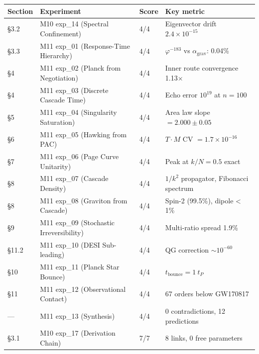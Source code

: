 \documentclass[11pt,a4paper]{article}
\begin{document}
\begin{longtable}[]{@{}llll@{}}
\toprule
Section & Experiment & Score & Key metric \\
\midrule\endhead
§3.2 & M10 exp\_14 (Spectral Confinement) & 4/4 & Eigenvector drift $2.4 \times 10^{-15}$ \\
§3.3 & M11 exp\_01 (Response-Time Hierarchy) & 4/4 & $\varphi^{-183}$ vs $\alpha_{\text{grav}}$: 0.04\% \\
§4 & M11 exp\_02 (Planck from Negotiation) & 4/4 & Inner route convergence 1.13$\times$ \\
§4 & M11 exp\_03 (Discrete Cascade Time) & 4/4 & Echo error $10^{19}$ at $n = 100$ \\
§5 & M11 exp\_04 (Singularity Saturation) & 4/4 & Area law slope $= 2.000 \pm 0.05$ \\
§6 & M11 exp\_05 (Hawking from PAC) & 4/4 & $T \cdot M$ CV $= 1.7 \times 10^{-16}$ \\
§7 & M11 exp\_06 (Page Curve Unitarity) & 4/4 & Peak at $k/N = 0.5$ exact \\
§8 & M11 exp\_07 (Cascade Density) & 4/4 & $1/k^2$ propagator, Fibonacci spectrum \\
§8 & M11 exp\_08 (Graviton from Cascade) & 4/4 & Spin-2 (99.5\%), dipole < 1\% \\
§9 & M11 exp\_09 (Stochastic Irreversibility) & 4/4 & Multi-ratio spread 1.9\% \\
§11.2 & M11 exp\_10 (DESI Sub-leading) & 4/4 & QG correction $\sim 10^{-60}$ \\
§10 & M11 exp\_11 (Planck Star Bounce) & 4/4 & $t_{\text{bounce}} = 1\ t_P$ \\
§11 & M11 exp\_12 (Observational Contact) & 4/4 & 67 orders below GW170817 \\
— & M11 exp\_13 (Synthesis) & 4/4 & 0 contradictions, 12 predictions \\
§3.1 & M10 exp\_17 (Derivation Chain) & 7/7 & 8 links, 0 free parameters \\
\bottomrule
\end{longtable}
\end{document}
